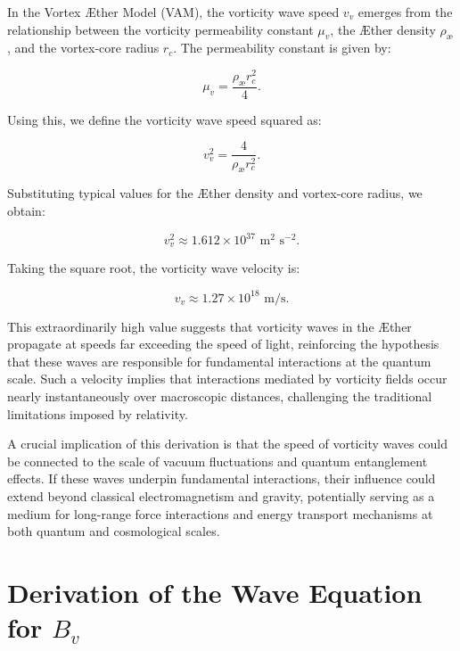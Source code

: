 \documentclass[a4paper,10pt]{article}
\begin{document}
In the Vortex Æther Model (VAM), the vorticity wave speed $v_v$ emerges from the relationship between the vorticity permeability constant $\mu_v$, the Æther density $\rho_\text{\ae}$, and the vortex-core radius $r_c$. The permeability constant is given by:

\begin{equation*}
    \mu_v = \frac{\rho_\text{\ae} r_c^2}{4}.
\end{equation*}

Using this, we define the vorticity wave speed squared as:

\begin{equation*}
    v_v^2 = \frac{4}{\rho_\text{\ae} r_c^2}.
\end{equation*}

Substituting typical values for the Æther density and vortex-core radius, we obtain:

\begin{equation*}
    v_v^2 \approx 1.612 \times 10^{37} \text{ m}^2 \text{ s}^{-2}.
\end{equation*}

Taking the square root, the vorticity wave velocity is:

\begin{equation*}
    v_v \approx 1.27 \times 10^{18} \text{ m/s}.
\end{equation*}

This extraordinarily high value suggests that vorticity waves in the Æther propagate at speeds far exceeding the speed of light, reinforcing the hypothesis that these waves are responsible for fundamental interactions at the quantum scale. Such a velocity implies that interactions mediated by vorticity fields occur nearly instantaneously over macroscopic distances, challenging the traditional limitations imposed by relativity.

A crucial implication of this derivation is that the speed of vorticity waves could be connected to the scale of vacuum fluctuations and quantum entanglement effects. If these waves underpin fundamental interactions, their influence could extend beyond classical electromagnetism and gravity, potentially serving as a medium for long-range force interactions and energy transport mechanisms at both quantum and cosmological scales.

\section{Derivation of the Wave Equation for $B_v$}
\end{document}
